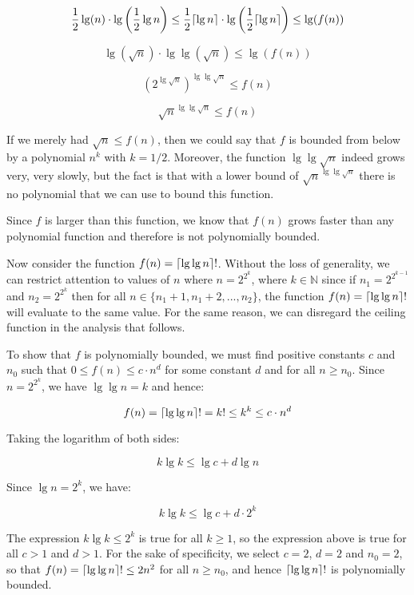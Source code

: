 \documentclass[a4paper,12pt]{article}
\DeclarePairedDelimiter\ceil{\lceil}{\rceil}
\begin{document}
\[ \frac{1}{2}\lg (n)  \cdot \lg \left(\frac{1}{2}\lg n\right) \le \frac{1}{2} \ceil{\lg n} \cdot \lg \left(\frac{1}{2}\ceil{\lg n }\right) \le \lg(f(n)) \]

\[ \lg \left( \sqrt{n}\right) \cdot \lg \lg \left(\sqrt{n} \right) \le \lg (f(n)) \]

\[ \left(2^{\lg \sqrt{n}}\right)^{\lg \lg \sqrt{n}} \le f(n) \]

\[ \sqrt{n}^{\lg \lg \sqrt{n}} \le f(n) \]

If we merely had $\sqrt{n} \le f(n)$, then we could say that $f$ is bounded from below by a polynomial $n^k$ with $k=1/2$. Moreover, the function $\lg \lg \sqrt{n}$ indeed grows very, very slowly, but the fact is that with a lower bound of $\sqrt{n}^{\lg \lg \sqrt{n}}$ there is no polynomial that we can use to bound this function. 

Since $f$ is larger than this function, we know that $f(n)$ grows faster than any polynomial function and therefore is not polynomially bounded.

Now consider the function $f(n) = \ceil{\lg \lg n}!$. Without the loss of generality, we can restrict attention to values of $n$ where $n=2^{2^k}$, where $k \in \mathbb{N}$ since if $n_1=2^{2^{k-1}}$ and $n_2 =2^{2^k}$ then for all $n \in \{n_1+1, n_1+2, ..., n_2\}$, the function $f(n) = \ceil{\lg \lg n}!$ will evaluate to the same value. For the same reason, we can disregard the ceiling function in the analysis that follows. 

To show that $f$ is polynomially bounded, we must find positive constants $c$ and $n_0$ such that $0 \le f(n) \le c \cdot n^d$ for some constant $d$ and for all $n \ge n_0$. Since $n = 2^{2^k}$, we have $\lg \lg n = k$ and hence:

\[ f(n) = \ceil{\lg \lg n}! = k! \le k^k \le c \cdot n^d\]

Taking the logarithm of both sides:

\[ k \lg k \le \lg c + d \lg n \]

Since $\lg n = 2^k$, we have:

\[ k \lg k \le \lg c + d \cdot 2^k\]

The expression $k \lg k \le 2^k$ is true for all $k \ge 1$, so the expression above is true for all $c > 1$ and $d > 1$. For the sake of specificity, we select $c=2$, $d=2$ and $n_0=2$, so that $f(n) = \ceil{\lg \lg n}! \le 2 n^2$ for all $n \ge n_0$, and hence $\ceil{\lg \lg n}!$ is polynomially bounded.

\vspace{2mm}
\end{document}
